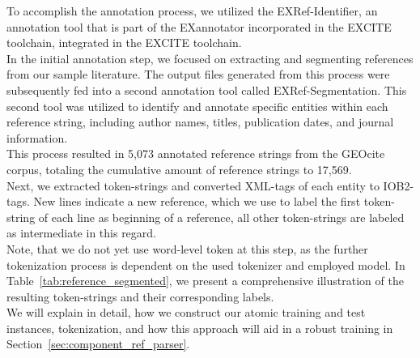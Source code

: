 To accomplish the annotation process, we utilized the EXRef-Identifier, an annotation tool that is part of the EXannotator incorporated in the EXCITE toolchain, integrated in the EXCITE toolchain.\\
In the initial annotation step, we focused on extracting and segmenting references from our sample literature. The output files generated from this process were subsequently fed into a second annotation tool called EXRef-Segmentation. This second tool was utilized to identify and annotate specific entities within each reference string, including author names, titles, publication dates, and journal information.\\
This process resulted in 5,073 annotated reference strings from the GEOcite corpus, totaling the cumulative amount of reference strings to 17,569.\\

Next, we extracted token-strings and converted XML-tags of each entity to IOB2-tags. New lines indicate a new reference, which we use to label the first token-string of each line as beginning of a reference, all other token-strings are labeled as intermediate in this regard.\\
Note, that we do not yet use word-level token at this step, as the further tokenization process is dependent on the used tokenizer and employed model. In Table~\ref{tab:reference_segmented}, we present a comprehensive illustration of the resulting token-strings and their corresponding labels.\\
We will explain in detail, how we construct our atomic training and test instances, tokenization, and how this approach will aid in a robust training in Section~\ref{sec:component_ref_parser}.

